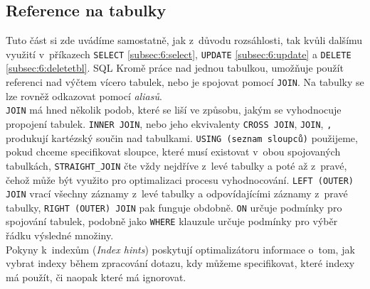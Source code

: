 \subsection{Reference na tabulky} \label{subsec:6:tblref}
Tuto část si zde uvádíme samostatně, jak z~důvodu rozsáhlosti, tak kvůli dalšímu využití v~příkazech \texttt{SELECT} \ref{subsec:6:select}, 
\texttt{UPDATE} \ref{subsec:6:update} a \texttt{DELETE} \ref{subsec:6:deletetbl}. SQL Kromě práce nad jednou tabulkou, umožňuje použít referenci 
nad výčtem vícero tabulek, nebo je spojovat pomocí \texttt{JOIN}. Na tabulky se lze rovněž odkazovat pomocí \textit{aliasů}. \\

\texttt{JOIN} má hned několik podob, které se liší ve způsobu, jakým se vyhodnocuje propojení tabulek. 
\texttt{INNER JOIN}, nebo jeho ekvivalenty \texttt{CROSS JOIN}, \texttt{JOIN}, \texttt{,} produkují kartézský součin nad tabulkami.
\texttt{USING (seznam sloupců)} použijeme, pokud chceme specifikovat sloupce, které musí existovat v~obou spojovaných tabulkách,
\texttt{STRAIGHT\_JOIN} čte vždy nejdříve z~levé tabulky a poté až z~pravé, čehož může být využito pro optimalizaci procesu vyhodnocování.
\texttt{LEFT (OUTER) JOIN} vrací všechny záznamy z~levé tabulky a odpovídajícími záznamy z~pravé tabulky,
\texttt{RIGHT (OUTER) JOIN} pak funguje obdobně.
\texttt{ON} určuje podmínky pro spojování tabulek, podobně jako \texttt{WHERE} klauzule určuje podmínky pro výběr řádku
výsledné množiny. \\

Pokyny k~indexům (\textit{Index hints}) poskytují optimalizátoru informace o~tom, jak vybrat indexy během zpracování dotazu,
kdy můžeme specifikovat, které indexy má použít, či naopak které má ignorovat. \\

